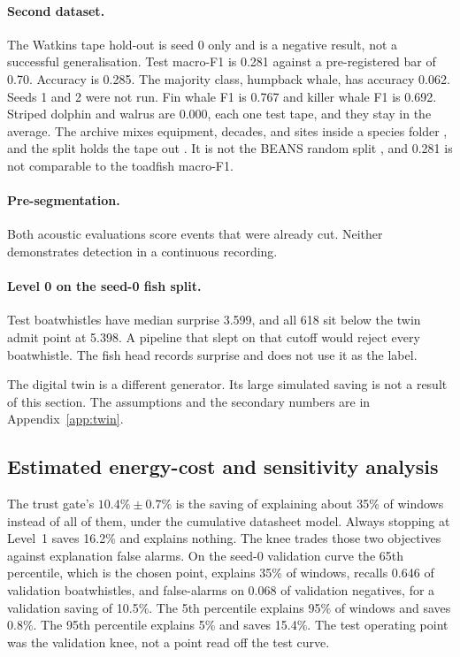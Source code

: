 \documentclass[sn-mathphys-num]{sn-jnl}%
\theoremstyle{thmstyleone}%
\theoremstyle{thmstyletwo}%
\theoremstyle{thmstylethree}%
\begin{document}
\paragraph{Second dataset.}
The Watkins tape hold-out is seed 0 only and is a negative result, not a successful generalisation. Test macro-F1 is 0.281 against a pre-registered bar of 0.70. Accuracy is 0.285. The majority class, humpback whale, has accuracy 0.062. Seeds 1 and 2 were not run. Fin whale F1 is 0.767 and killer whale F1 is 0.692. Striped dolphin and walrus are 0.000, each one test tape, and they stay in the average. The archive mixes equipment, decades, and sites inside a species folder \cite{sayigh2016}, and the split holds the tape out \cite{aguiar2021}. It is not the BEANS random split \cite{hagiwara2022}, and 0.281 is not comparable to the toadfish macro-F1.

\paragraph{Pre-segmentation.}
Both acoustic evaluations score events that were already cut. Neither demonstrates detection in a continuous recording.

\paragraph{Level 0 on the seed-0 fish split.}
Test boatwhistles have median surprise 3.599, and all 618 sit below the twin admit point at 5.398. A pipeline that slept on that cutoff would reject every boatwhistle. The fish head records surprise and does not use it as the label.

The digital twin is a different generator. Its large simulated saving is not a result of this section. The assumptions and the secondary numbers are in Appendix~\ref{app:twin}.

\subsection{Estimated energy-cost and sensitivity analysis}\label{sec:sensitivity}

The trust gate's $10.4\% \pm 0.7\%$ is the saving of explaining about 35\% of windows instead of all of them, under the cumulative datasheet model. Always stopping at Level~1 saves 16.2\% and explains nothing. The knee trades those two objectives against explanation false alarms. On the seed-0 validation curve the 65th percentile, which is the chosen point, explains 35\% of windows, recalls 0.646 of validation boatwhistles, and false-alarms on 0.068 of validation negatives, for a validation saving of 10.5\%. The 5th percentile explains 95\% of windows and saves 0.8\%. The 95th percentile explains 5\% and saves 15.4\%. The test operating point was the validation knee, not a point read off the test curve.
\end{document}
